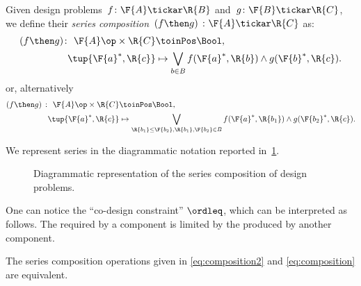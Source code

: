 \begin{definition}
\label{def:dp-series}
Given design problems~$f \colon  \F{A} \tickar \R{B}$ and~$g \colon \F{B} \tickar \R{C}$, we define their \emph{series composition}~$(f\then g)\ \colon  \F{A} \tickar \R{C}$
as:
\begin{equation}
\label{eq:composition2}
\begin{aligned}
   (f \then g)  \colon \ \F{A}\op \times \R{C} & \toinPos  \Bool, \\
  \tup{\F{a}^*, \R{c}} &\mapsto \bigvee_{b\in B} f(\F{a}^*,\R{b}) \wedge g(\F{b}^*,\R{c}).
\end{aligned}
\end{equation}
or, alternatively
\begin{equation}
\begin{aligned}
\label{eq:composition}
   (f \then g)\  \colon \ \F{A}\op \times \R{C} & \toinPos  \Bool,  \\
  \tup{\F{a}^*, \R{c}} &\mapsto \bigvee_{\R{b_1}\leq\F{b_2}, \R{b_1},\F{b_2}\in B} f(\F{a}^*,\R{b_1}) \wedge g(\F{b_2}^*,\R{c}).
\end{aligned}
\end{equation}
\end{definition}
\noindent We represent series in the diagrammatic notation reported in~\cref{fig:compositiondiagram}.
\begin{figure}[h!]
\begin{center}
\end{center}
\caption{Diagrammatic representation of the series composition of design problems. \label{fig:compositiondiagram}}
\end{figure}

One can notice the ``co-design constraint'' $\ordleq$, which can be interpreted as follows. The  required by a component is limited by the  produced by another component.

\begin{lemma}
\label{lemma:composition_equivalency}
The series composition operations given in \cref{eq:composition2} and \cref{eq:composition} are equivalent.
\end{lemma}

